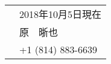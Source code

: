 \documentclass[utf8,letterpaper,oneside]{article}
\begin{document}
\setmainfont[BoldFont=ipaexg.ttf]{ipaexm.ttf}
\small


\begin{center}
 \begin{tabular}{l l}
   & \hspace{4in}2018年10月5日現在                  \\
   & \hspace{4in} {\setmainfont{kaiu.ttf} 原　晣也} \\
   & \hspace{4in}+1 (814) 883-6639                  \\
 \end{tabular}
\end{center}
\noindent
\end{document}
